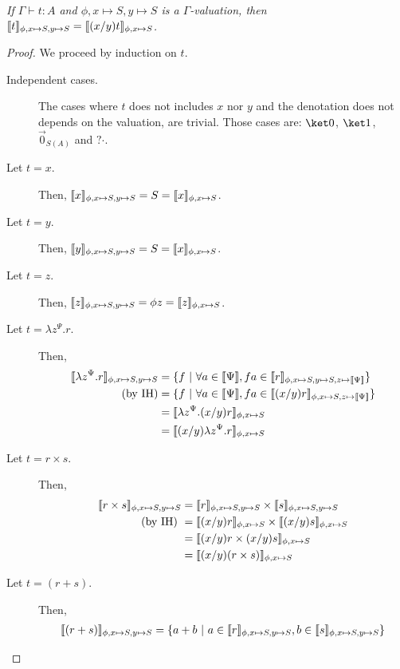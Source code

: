 \documentclass[preprint]{elsarticle}
\newcommand\recap[3]{\noindent {\bf #1 \ref{#2}.} \emph{#3}}
\newcommand\gB{\ensuremath{\Psi}}
\newcommand\ite[3]{{#1}?{#2}\mathord{\cdot}{#3}}
\newcommand\pair[2]{({#1}+{#2})}
\newcommand\z[1][A]{\vec 0_{S(#1)}}
\begin{document}
\recap{Lemma}{lem:subsDen}{
  If $\Gamma\vdash t:A$ and $\phi,x\mapsto S,y\mapsto S$ is a
  $\Gamma$-valuation, then $\llbracket t \rrbracket_{\phi,x\mapsto S,y\mapsto
    S}=\llbracket (x/y)t \rrbracket_{\phi,x\mapsto S}$.
}
\begin{proof}
  We proceed by induction on $t$.
  \begin{description}
  \item[Independent cases.] The cases where $t$ does not includes $x$ nor $y$
    and the denotation does not depends on the valuation, are trivial. Those
    cases are: $\ket 0$, $\ket 1$, $\z$ and $\ite{}{}{}$.
  \item[Let $t=x$.] Then, $\llbracket x \rrbracket_{\phi,x\mapsto S,y\mapsto S}=S=\llbracket x \rrbracket_{\phi,x\mapsto S}$.
  \item[Let $t=y$.] Then, $\llbracket y \rrbracket_{\phi,x\mapsto S,y\mapsto S}=S=\llbracket x \rrbracket_{\phi,x\mapsto S}$.
  \item[Let $t=z$.] Then, $\llbracket z \rrbracket_{\phi,x\mapsto S,y\mapsto S}=\phi z=\llbracket z \rrbracket_{\phi,x\mapsto S}$.
  \item[Let $t=\lambda z^{\gB}.r$.] Then,
    \begin{align*}
      \den{\lambda z^{\gB}.r}_{\phi,x\mapsto S,y\mapsto S}
      &=\{f~|~\forall a\in\den{\gB},fa\in\den r_{\phi,x\mapsto S,y\mapsto S,z\mapsto\den{\gB}}\}\\
      \textrm{(by IH)} &=\{f~|~\forall a\in\den{\gB},fa\in\den{(x/y)r}_{\phi,x\mapsto S,z\mapsto\den{\gB}}\}\\
      &=\den{\lambda z^{\gB}.(x/y)r}_{\phi,x\mapsto S}\\
      &=\den{(x/y)\lambda z^{\gB}.r}_{\phi,x\mapsto S}
    \end{align*}
  \item[Let $t=r\times s$.] Then,
    \begin{align*}
      \llbracket r\times s \rrbracket_{\phi,x\mapsto S,y\mapsto S}
      &=\llbracket r \rrbracket_{\phi,x\mapsto S,y\mapsto S}\times\llbracket s \rrbracket_{\phi,x\mapsto S,y\mapsto S}\\
      \textrm{(by IH) }&=\llbracket (x/y)r \rrbracket_{\phi,x\mapsto S}\times\llbracket (x/y)s \rrbracket_{\phi,x\mapsto S}\\
      &=\llbracket (x/y)r\times(x/y)s \rrbracket_{\phi,x\mapsto S}\\
      &=\llbracket (x/y)(r\times s) \rrbracket_{\phi,x\mapsto S}
    \end{align*}
  \item[Let $t=\pair rs$.] Then,
    \begin{align*}
      \den{\pair rs}_{\phi,x\mapsto S,y\mapsto S}
      &=\{a+b~|~a\in\den r_{\phi,x\mapsto S,y\mapsto S},b\in\den s_{\phi,x\mapsto S,y\mapsto S}\}\\

\end{align*}
\end{description}
\end{proof}
\end{document}
